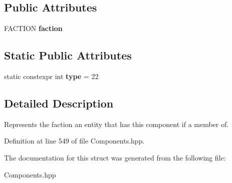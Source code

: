 \subsection*{Public Attributes}
\begin{DoxyCompactItemize}
\item 
F\+A\+C\+T\+I\+ON {\bfseries faction}\hypertarget{struct_faction_component_aad10499e3145f032068dc94120b6564a}{}\label{struct_faction_component_aad10499e3145f032068dc94120b6564a}

\end{DoxyCompactItemize}
\subsection*{Static Public Attributes}
\begin{DoxyCompactItemize}
\item 
static constexpr int {\bfseries type} = 22\hypertarget{struct_faction_component_a39a377f8a913b350da8de13ea335726d}{}\label{struct_faction_component_a39a377f8a913b350da8de13ea335726d}

\end{DoxyCompactItemize}


\subsection{Detailed Description}
Represents the faction an entity that has this component if a member of. 

Definition at line 549 of file Components.\+hpp.



The documentation for this struct was generated from the following file\+:\begin{DoxyCompactItemize}
\item 
Components.\+hpp\end{DoxyCompactItemize}
